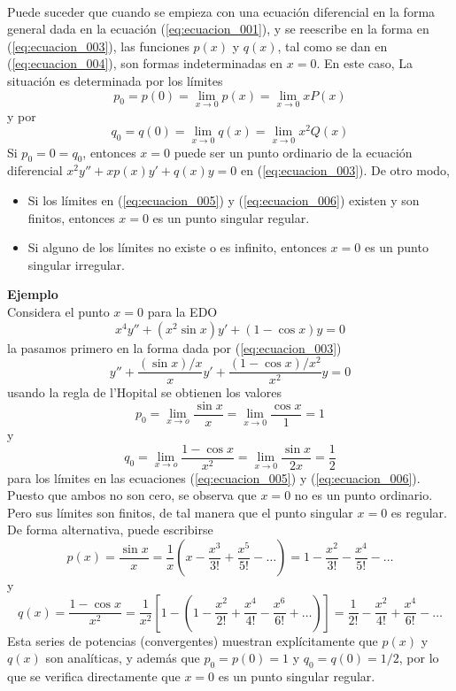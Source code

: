 \\
Puede suceder que cuando se empieza con una ecuación diferencial en la forma general dada en la ecuación (\ref{eq:ecuacion_001}), y se reescribe en la forma en (\ref{eq:ecuacion_003}), las funciones $p(x)$ y $q(x)$, tal como se dan en (\ref{eq:ecuacion_004}), son formas indeterminadas en $x = 0$. En este caso, La situación es determinada por los límites
\begin{equation}
p_{0} = p(0) = \lim_{x \to 0} p(x) = \lim_{x \to 0} x P(x)
\label{eq:ecuacion_005}
\end{equation}
y por
\begin{equation}
q_{0} = q(0) = \lim_{x \to 0} q(x) = \lim_{x \to 0} x^{2} Q(x)
\label{eq:ecuacion_006}
\end{equation}
Si $p_{0} = 0 = q_{0}$, entonces $x = 0$ puede ser un punto ordinario de la ecuación diferencial $x^{2}y'' + xp(x) y'+ q(x)y = 0$ en (\ref{eq:ecuacion_003}). De otro modo,
\begin{itemize}
\item Si los límites en (\ref{eq:ecuacion_005}) y (\ref{eq:ecuacion_006}) existen y son finitos, entonces $x = 0$ es un punto singular regular.
\item Si alguno de los límites no existe o es infinito, entonces $x = 0$ es un punto singular irregular.
\end{itemize}
\textbf{Ejemplo}
\\
Considera el punto $x=0$ para la EDO 
\[ x^{4} y'' + (x^{2} \sin x) y' + (1 - \cos x) y = 0 \]
la pasamos primero en la forma dada por (\ref{eq:ecuacion_003})
\[ y'' + \dfrac{(\sin x)/x}{x} y' + \dfrac{(1-\cos x)/x^{2}}{x^{2}} y = 0 \]
usando la regla de l'Hopital se obtienen los valores
\[ p_{0} = \lim_{x \to o} \dfrac{\sin x}{x} = \lim_{x \to 0} \dfrac{\cos x}{1} = 1 \]
y 
\[ q_{0} = \lim_{x \to o} \dfrac{1 - \cos x}{x^{2}} = \lim_{x \to 0} \dfrac{\sin x}{2x} = \dfrac{1}{2} \]
para los límites en las ecuaciones (\ref{eq:ecuacion_005}) y (\ref{eq:ecuacion_006}). Puesto que ambos no son cero, se observa que $x = 0$ no es un punto ordinario. Pero sus límites son finitos, de tal manera que el punto singular $x = 0$ es regular. De forma alternativa, puede escribirse
\[ p(x) = \dfrac{\sin x}{x} = \dfrac{1}{x} \left( x - \dfrac{x^{3}}{3!} + \dfrac{x^{5}}{5!} - \ldots \right) = 1 - \dfrac{x^{2}}{3!} - \dfrac{x^{4}}{5!} - \ldots \]
y
\[ q(x) = \dfrac{1 - \cos x}{x^{2}} = \dfrac{1}{x^{2}} \left[ 1 - \left( 1 -  \dfrac{x^{2}}{2!} + \dfrac{x^{4}}{4!} - \dfrac{x^{6}}{6!} +  \ldots \right) \right] = \dfrac{1}{2!} - \dfrac{x^{2}}{4!} + \dfrac{x^{4}}{6!} - \ldots \]
Esta series de potencias (convergentes) muestran explícitamente que $p(x)$ y $q(x)$ son analíticas, y además que $p_{0} =  p(0) = 1$ y $q_{0} = q(0) = 1/2$, por lo que se verifica directamente que $x = 0$ es un punto singular regular.

